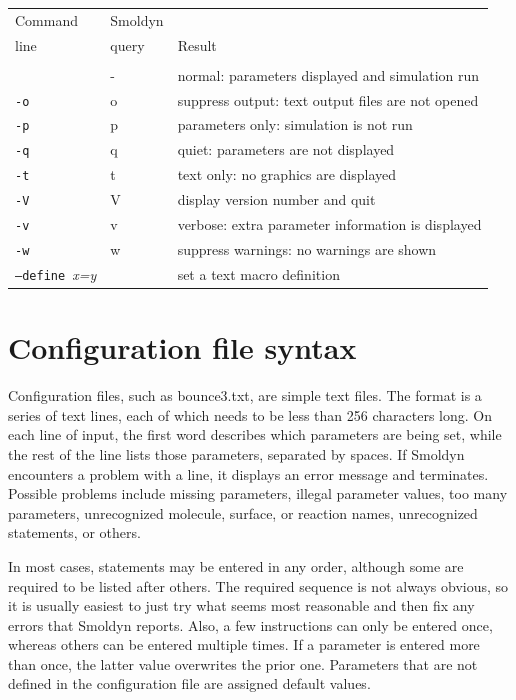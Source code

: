 \documentclass {book}
\newcommand {\ttt} {\texttt}
\newcommand {\param} {\textit}
\begin{document}
\begin{longtable}[c]{lll}
Command & Smoldyn\\
line & query & Result\\
\hline\\
 & - & normal: parameters displayed and simulation run\\
\ttt{-o} & o & suppress output: text output files are not opened\\
\ttt{-p} & p & parameters only: simulation is not run\\
\ttt{-q} & q & quiet: parameters are not displayed\\
\ttt{-t} & t & text only: no graphics are displayed\\
\ttt{-V} & V & display version number and quit\\
\ttt{-v} & v & verbose: extra parameter information is displayed\\
\ttt{-w} & w & suppress warnings: no warnings are shown\\
\ttt{--define }\param{x=y} &  & set a text macro definition\\
\end{longtable}

\section{Configuration file syntax}

Configuration files, such as bounce3.txt, are simple text files. The format is a series of text lines, each of which needs to be less than 256 characters long. On each line of input, the first word describes which parameters are being set, while the rest of the line lists those parameters, separated by spaces. If Smoldyn encounters a problem with a line, it displays an error message and terminates. Possible problems include missing parameters, illegal parameter values, too many parameters, unrecognized molecule, surface, or reaction names, unrecognized statements, or others.

In most cases, statements may be entered in any order, although some are required to be listed after others. The required sequence is not always obvious, so it is usually easiest to just try what seems most reasonable and then fix any errors that Smoldyn reports. Also, a few instructions can only be entered once, whereas others can be entered multiple times. If a parameter is entered more than once, the latter value overwrites the prior one. Parameters that are not defined in the configuration file are assigned default values.
\end{document}
